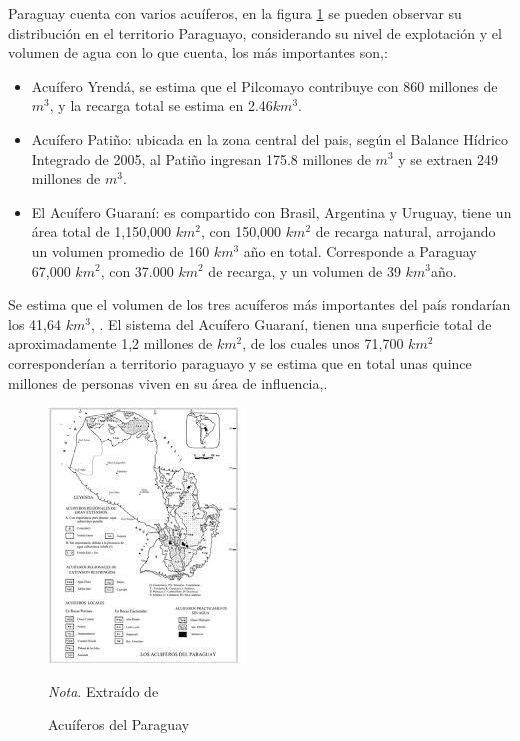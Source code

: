 Paraguay cuenta con varios acu\'iferos, en la figura \ref{acuiferosPy} se pueden observar su distribuci\'on en el territorio Paraguayo, considerando su nivel de explotaci\'on y el volumen de agua con lo que cuenta, los m\'as importantes son,\cite{FAO_2015}:
\begin{itemize}
    \item Acu\'ifero Yrendá, se estima que el Pilcomayo contribuye con 860 millones de $m^{3}$, y la recarga total se estima en  2.46$km^{3}$.
    \item Acu\'ifero Pati\~no: ubicada en la zona central del pais, según el Balance Hídrico Integrado de 2005, al Pati\~no ingresan 175.8 millones de $m^{3}$ y se extraen 249 millones de $m^{3}$. 
    \item El Acu\'ifero Guaran\'i: es compartido con Brasil, Argentina y 
    Uruguay, tiene un área total de 1,150,000 $km^{2}$, con 150,000 
    $km^{2}$ de recarga natural, arrojando un volumen promedio de 160 
    $km^{3}$ a\~no en total. Corresponde a Paraguay 67,000 $km^{2}$, con 
    37.000 $km^{2}$ de recarga, y un volumen de 39 $km^{3}$a\~no. 
\end{itemize}
Se estima que el volumen de los tres acu\'iferos m\'as importantes del pa\'is rondar\'ian los 41,64 $km^{3}$, \cite{alvarez-2014}.
El sistema del Acuífero Guaraní, tienen una superficie total de aproximadamente 1,2 millones de $km^{2}$, de los cuales unos 71,700 $km^{2}$ corresponderían a territorio paraguayo y se estima que en total unas quince millones de personas viven en su área de influencia,\cite{salas-duenas-2015}.

\begin{figure}[ht]
    \caption {Acuíferos del Paraguay} 
    \centering
    \label{acuiferosPy}
    \includegraphics[scale=1]{Imagenes/cap2/images.jpg}\\
    \bigskip
    \raggedright
    \small \textit{Nota}. Extra\'ido de \cite{alvarez-2014} 
\end{figure}

